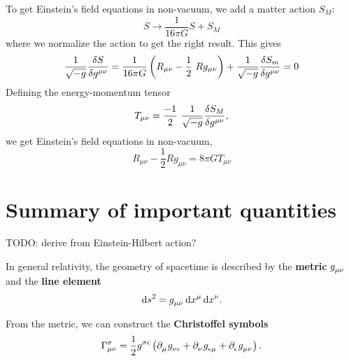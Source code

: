 To get Einstein's field equations in non-vacuum, we add a matter action $S_M$:
\begin{equation}
	S \rightarrow \frac{1}{16 \pi G} S + S_M
\end{equation}
where we normalize the action to get the right result.
This gives
\begin{equation}
	\frac{1}{\sqrt{-g}} \frac{\variation{S}}{\variation{g^{\mu \nu}}} = \frac{1}{16 \pi G} \left( R_{\mu \nu} - \frac{1}{2} R g_{\mu \nu} \right) + \frac{1}{\sqrt{-g}} \frac{\variation{S_m}}{\variation{g^{\mu \nu}}} = 0
\end{equation}
Defining the energy-momentum tensor
\begin{equation}
	T_{\mu \nu} = \frac{-1}{2} \frac{1}{\sqrt{-g}} \frac{\variation{S_M}}{\variation{g^{\mu \nu}}} ,
\end{equation}
we get Einstein's field equations in non-vacuum,
\begin{equation}
	R_{\mu \nu} - \frac{1}{2} R g_{\mu \nu} = 8 \pi G T_{\mu \nu}
\end{equation}

\section{Summary of important quantities}
\label{chap:gr_summary} %

TODO: derive from Einstein-Hilbert action?

In general relativity, the geometry of spacetime is described by the \textbf{metric} $g\indices{_\mu_\nu}$ and the \textbf{line element}
\begin{equation}
	\dif s^2 = g\indices{_\mu_\nu} \dif x^\mu \dif x^\nu .
	\label{eq:def_line_elem}
\end{equation}

From the metric, we can construct the \textbf{Christoffel symbols}
\begin{equation}
	\Gamma^\sigma_{\mu \nu} = \frac{1}{2} g\indices{^\sigma^\epsilon} \left(
		\partial\indices{_\mu} g\indices{_\nu_\epsilon} +
		\partial\indices{_\nu} g\indices{_\epsilon_\mu} +
		\partial\indices{_\epsilon} g\indices{_\mu_\nu}
	\right) .
	\label{eq:def_christoffel}
\end{equation}

